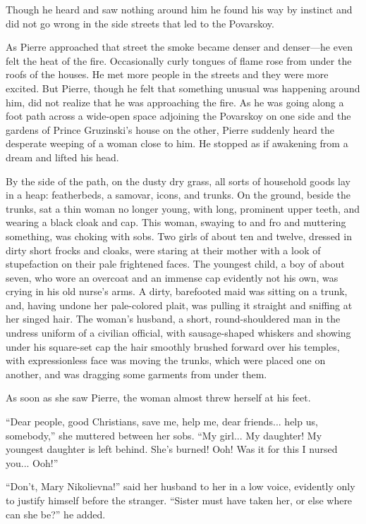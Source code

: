 Though he heard and saw nothing around him he found his way by
instinct and did not go wrong in the side streets that led to the
Povarskoy.

As Pierre approached that street the smoke became denser and
denser---he even felt the heat of the fire. Occasionally curly
tongues of flame rose from under the roofs of the houses. He met
more people in the streets and they were more excited. But
Pierre, though he felt that something unusual was happening
around him, did not realize that he was approaching the fire. As
he was going along a foot path across a wide-open space adjoining
the Povarskoy on one side and the gardens of Prince Gruzinski's
house on the other, Pierre suddenly heard the desperate weeping
of a woman close to him. He stopped as if awakening from a dream
and lifted his head.

By the side of the path, on the dusty dry grass, all sorts of
household goods lay in a heap: featherbeds, a samovar, icons, and
trunks. On the ground, beside the trunks, sat a thin woman no
longer young, with long, prominent upper teeth, and wearing a
black cloak and cap. This woman, swaying to and fro and muttering
something, was choking with sobs. Two girls of about ten and
twelve, dressed in dirty short frocks and cloaks, were staring at
their mother with a look of stupefaction on their pale frightened
faces. The youngest child, a boy of about seven, who wore an
overcoat and an immense cap evidently not his own, was crying in
his old nurse's arms. A dirty, barefooted maid was sitting on a
trunk, and, having undone her pale-colored plait, was pulling it
straight and sniffing at her singed hair. The woman's husband, a
short, round-shouldered man in the undress uniform of a civilian
official, with sausage-shaped whiskers and showing under his
square-set cap the hair smoothly brushed forward over his
temples, with expressionless face was moving the trunks, which
were placed one on another, and was dragging some garments from
under them.

As soon as she saw Pierre, the woman almost threw herself at his
feet.

``Dear people, good Christians, save me, help me, dear
friends... help us, somebody,'' she muttered between her
sobs. ``My girl... My daughter!  My youngest daughter is left
behind. She's burned! Ooh! Was it for this I nursed you... Ooh!''

``Don't, Mary Nikolievna!'' said her husband to her in a low
voice, evidently only to justify himself before the
stranger. ``Sister must have taken her, or else where can she
be?'' he added.

